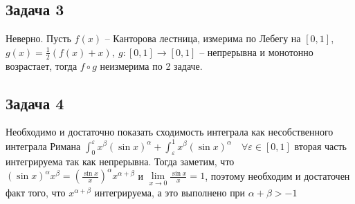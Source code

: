 	
\subsection*{Задача 3}
	Неверно. Пусть $f(x)$ -- Канторова лестница, измерима по Лебегу на $[0,1]$, $g(x) = \frac{1}{2}(f(x) + x),\ g:[0,1] \to [0,1]$ -- непрерывна и монотонно возрастает, тогда $f \circ g$ неизмерима по 2 задаче.
	\vskip0.5in
	
	
\subsection*{Задача 4}
	Необходимо и достаточно показать сходимость интеграла как несобственного интеграла Римана $\int_{0}^{\varepsilon} x^{\beta} (\sin x)^{\alpha} + \int_{\varepsilon}^{1} x^{\beta} (\sin x)^{\alpha}\quad \forall \varepsilon \in [0,1]$ вторая часть интегрируема так как непрерывна. Тогда заметим, что $(\sin x)^{\alpha} x^{\beta} = \left(\frac{\sin x}{x}\right)^{\alpha} x^{\alpha + \beta}$ и $\lim\limits_{x \to 0} \frac{\sin x}{x} = 1$, поэтому необходим и достаточен факт того, что $x^{\alpha + \beta}$ интегрируема, а это выполнено при $\alpha + \beta > -1$
\begin{comment}
	$\sin x^{\alpha} = (x - \frac{x^3}{3!} + \frac{x^5}{5!} - \dots)^{\alpha} < x^{\alpha}$\\
	По определению, если ряд $\sum\limits_{n=1}^{\infty} \mu(x:\ |f(x)| \geqslant n)$ сходится, то $f$ интегрируема\\
	$(\sin x)^{\alpha} x^{\beta} < x^{\alpha + \beta}$\\
	Если ряд $\sum\limits_{n=1}^{\infty} \mu(x:\ x^{\alpha + \beta} \geqslant n)$ сходится, то ряд $\sum\limits_{n=1}^{\infty} \mu(x:\ (\sin x)^{\alpha} x^{\beta} \geqslant n)$ тоже сходится
	\begin{gather*}
	\sum\limits_{n=1}^{\infty} \mu(x:\ x^{\alpha + \beta} \geqslant n) = 
	\sum\limits_{n=1}^{\infty} \mu(x:\ x \geqslant n^{\frac{1}{\alpha + \beta}}) =
	\sum\limits_{n=1}^{\infty} n^{\frac{1}{\alpha + \beta}}
	\end{gather*}
	Сходится при $-\frac{1}{\alpha + \beta}\Leftrightarrow \alpha + \beta > -1$
\end{comment}
	\vskip0.5in


